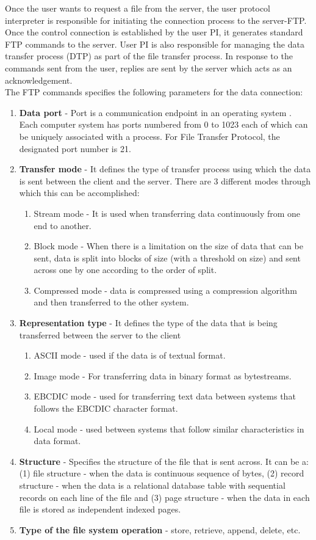 \documentclass[9pt,twocolumn,twoside]{styles/osajnl}
\begin{document}
Once the user wants to request a file from the server, the user protocol interpreter is responsible for initiating the connection process to the server-FTP. Once the control connection is established by the user PI, it generates standard FTP commands to the server. User PI is also responsible for managing the data transfer process (DTP) as part of the file transfer process. In response to the commands sent from the user, replies are sent by the server which acts as an acknowledgement.\\
The FTP commands specifies the following parameters for the data connection:
\begin{enumerate}
    \item \textbf{Data port} - Port is a communication endpoint in an operating system \cite{www-wiki-port}. Each computer system has ports numbered from 0 to 1023 each of which can be uniquely associated with a process. For File Transfer Protocol, the designated port number is 21.
    \item \textbf{Transfer mode} - It defines the type of transfer process using which the data is sent between the client and the server. There are 3 different modes through which this can be accomplished:
    \begin{enumerate}
        \item Stream mode - It is used when transferring data continuously from one end to another.
        \item Block mode - When there is a limitation on the size of data that can be sent, data is split into blocks of size (with a threshold on size) and sent across one by one according to the order of split.
        \item Compressed mode - data is compressed using a compression algorithm and then transferred to the other system.
    \end{enumerate}
    \item \textbf{Representation type} - It defines the type of the data that is being transferred between the server to the client
    \begin{enumerate}
    \item ASCII  mode - used if the data is of textual format. 
    \item Image mode - For transferring data in binary format as bytestreams. 
    \item EBCDIC  mode - used for transferring text data between systems that follows the EBCDIC character format.
    \item Local mode - used between systems that follow similar characteristics in data format.
    \end{enumerate}
    \item \textbf{Structure} - Specifies the structure of the file that is sent across. It can be a: (1) file structure - when the data is continuous sequence of bytes, (2) record structure - when the data is a relational database table with sequential records on each line of the file and (3) page structure - when the data in each file is stored as independent indexed pages.  
    \item \textbf{Type of the file system operation} - store, retrieve, append, delete, etc.
\end{enumerate}
\end{document}
